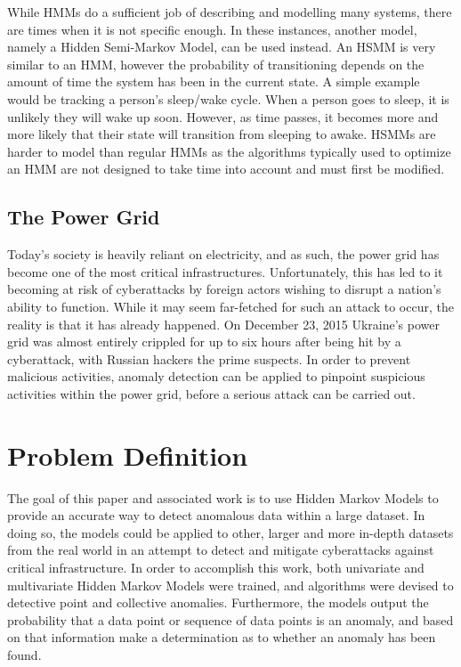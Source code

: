 \documentclass[letterpaper, 11pt]{article}%
\begin{document}
While HMMs do a sufficient job of describing and modelling many systems, there are times when it is not specific enough. In these instances, another model, namely a Hidden Semi-Markov Model, can be used instead. An HSMM is very similar to an HMM, however the probability of transitioning depends on the amount of time the system has been in the current state. A simple example would be tracking a person's sleep/wake cycle. When a person goes to sleep, it is unlikely they will wake up soon. However, as time passes, it becomes more and more likely that their state will transition from sleeping to awake. HSMMs are harder to model than regular HMMs as the algorithms typically used to optimize an HMM are not designed to take time into account and must first be modified.

\subsection{The Power Grid}
Today's society is heavily reliant on electricity, and as such, the power grid has become one of the most critical infrastructures. Unfortunately, this has led to it becoming at risk of cyberattacks by foreign actors wishing to disrupt a nation's ability to function. While it may seem far-fetched for such an attack to occur, the reality is that it has already happened. On December 23, 2015 Ukraine's power grid was almost entirely crippled for up to six hours after being hit by a cyberattack, with Russian hackers the prime suspects\cite{ukraine}. In order to prevent malicious activities, anomaly detection can be applied to pinpoint suspicious activities within the power grid, before a serious attack can be carried out.

\section{Problem Definition}
The goal of this paper and associated work is to use Hidden Markov Models to provide an accurate way to detect anomalous data within a large dataset. In doing so, the models could be applied to other, larger and more in-depth datasets from the real world in an attempt to detect and mitigate cyberattacks against critical infrastructure. In order to accomplish this work, both univariate and multivariate Hidden Markov Models were trained, and algorithms were devised to detective point and collective anomalies. Furthermore, the models output the probability that a data point or sequence of data points is an anomaly, and based on that information make a determination as to whether an anomaly has been found.
\end{document}

